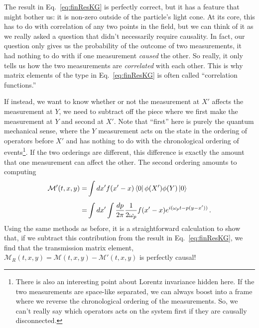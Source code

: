 \documentclass{article}
\numberwithin{equation}{subsection}
\begin{document}
The result in Eq.~\eqref{eq:finResKG} is perfectly correct, but it has a feature that might bother us: it is non-zero outside of the particle's light cone. At its core, 
this has to do with correlation of any two points in the field, but we can think of it as we really asked a question that didn't necessarily require causality. In fact, 
our question only gives us the probability of the outcome of two measurements, it had nothing to do with if one measurement \textit{caused} 
the other. So really, it only tells us how the two measurements are \textit{correlated} with each other. This is why matrix elements of the type in Eq.~\eqref{eq:finResKG} 
is often called ``correlation functions.''

If instead, we want to know whether or not the measurement at $X'$ affects the measurement at $Y$, we need to subtract off the piece where we first make the measurement 
at $Y$ and second at $X'$. Note that ``first'' here is purely the quantum mechanical sense, where the $Y$ measurement acts on the state in the ordering of operators before 
$X'$ and has nothing to do with the chronological ordering of events\footnote{There is also an interesting point about Lorentz invariance hidden here. If the two measurements 
are space-like separated, we can always boost into a frame where we reverse the chronological ordering of the measurements. So, we can't really say which operators acts 
on the system first if they are causally disconnected.}. If the two orderings are different, this difference is exactly the amount that one measurement can affect the other. 
The second ordering amounts to computing
\begin{equation}\label{eq:antiParticle}
    \begin{split}
        \mathcal{M}'(t, x, y) =& \int dx'f(x' - x)\bra{0}\phi(X')\phi(Y)\ket{0} \\[0.5em]
        =&\int dx'\int\frac{dp}{2\pi}\frac{1}{2\omega_p}f(x'-x)e^{i(\omega_p t - p(y - x'))}\,.
    \end{split}
\end{equation}
Using the same methods as before, it is a straightforward calculation to show that, if we subtract this contribution from the result in Eq.~\eqref{eq:finResKG}, 
we find that the transmission matrix element, $\mathcal{M}_R(t, x, y) = \mathcal{M}(t, x, y) - \mathcal{M}'(t, x, y)$ is
perfectly causal!
\end{document}
